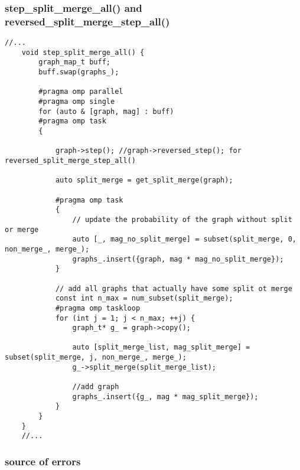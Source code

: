 \documentclass[11pt]{article}
\begin{document}
\subsubsection{step\_split\_merge\_all() and reversed\_split\_merge\_step\_all()}

\begin{lstlisting}[style=CStyle]
	//...
	void step_split_merge_all() {
		graph_map_t buff;
		buff.swap(graphs_);

		#pragma omp parallel
		#pragma omp single
		for (auto & [graph, mag] : buff)
		#pragma omp task
	  	{
	  		
	  		graph->step(); //graph->reversed_step(); for reversed_split_merge_step_all()

	  		auto split_merge = get_split_merge(graph);

	  		#pragma omp task
	  		{
	  			// update the probability of the graph without split or merge 
				auto [_, mag_no_split_merge] = subset(split_merge, 0, non_merge_, merge_);
				graphs_.insert({graph, mag * mag_no_split_merge});
	  		}

	  		// add all graphs that actually have some split ot merge 
	  		const int n_max = num_subset(split_merge);
	  		#pragma omp taskloop
	  		for (int j = 1; j < n_max; ++j) {
	  			graph_t* g_ = graph->copy();

	  			auto [split_merge_list, mag_split_merge] = subset(split_merge, j, non_merge_, merge_);
	  			g_->split_merge(split_merge_list);

	  			//add graph
	  			graphs_.insert({g_, mag * mag_split_merge});
	  		}
	  	}
	}
	//...
\end{lstlisting}

\subsubsection{source of errors}
\end{document}

